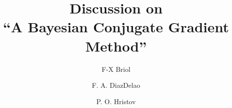 \documentclass{elsarticle}
\begin{document}
	\begin{frontmatter}
		\title{\textbf{Discussion on \\
		 ``A Bayesian Conjugate Gradient Method''}}
		
		\author{F-X Briol}
		
		\author{F. A. DiazDelao}%
		
		\author{P. O. Hristov}
		
		\address{University College London \& The Alan Turing Institute}
		\address{Institute for Risk and Uncertainty, University of Liverpool}
		
		\journal{}
	\end{frontmatter}
	

	
	
\end{document}
